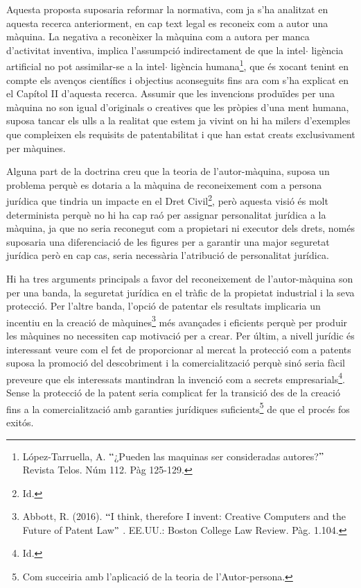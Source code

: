 \documentclass[12pt]{article}
\begin{document}
\vspace{\baselineskip}
Aquesta proposta suposaria reformar la normativa, com ja s’ha analitzat en aquesta recerca anteriorment, en cap text legal es reconeix com a autor una màquina. La negativa a reconèixer la màquina com a autora per manca d’activitat inventiva, implica l’assumpció indirectament de que la intel$ \cdot $ ligència artificial no pot assimilar-se a la intel$ \cdot $ ligència humana\footnote{ López-Tarruella, A. $``$¿Pueden las maquinas ser consideradas autores?$"$  Revista Telos. Núm 112. Pàg 125-129. }, que és xocant tenint en compte els avenços científics i objectius aconseguits fins ara com s’ha explicat en el Capítol II d’aquesta recerca. Assumir que les invencions produïdes per una màquina no son igual d’originals o creatives que les pròpies d’una ment humana, suposa tancar els ulls a la realitat que estem ja vivint on hi ha milers d’exemples que compleixen els requisits de patentabilitat i que han estat creats exclusivament per màquines. \par


\vspace{\baselineskip}
Alguna part de la doctrina creu que la teoria de l’autor-màquina, suposa un problema perquè es dotaria a la màquina de reconeixement com a persona jurídica que tindria un impacte en el Dret Civil\footnote{ Id. }, però aquesta visió és molt determinista perquè no hi ha cap raó per assignar personalitat jurídica a la màquina, ja que no seria reconegut com a propietari ni executor dels drets, només suposaria una diferenciació de les figures per a garantir una major seguretat jurídica però en cap cas, seria necessària l’atribució de personalitat jurídica.  \par


\vspace{\baselineskip}
Hi ha tres arguments principals a favor del reconeixement de l’autor-màquina son per una banda, la seguretat jurídica en el tràfic de la propietat industrial i la seva protecció. Per l’altre banda, l’opció de patentar els resultats implicaria un incentiu en la creació de màquines\footnote{ Abbott, R. (2016). $``$I think, therefore I invent: Creative Computers and the Future of Patent Law$"$ . EE.UU.: Boston College Law Review. Pàg. 1.104. } més avançades i eficients perquè per produir les màquines no necessiten cap motivació per a crear. Per últim, a nivell jurídic és interessant veure com el fet de proporcionar al mercat la protecció com a patents suposa la promoció del descobriment i la comercialització perquè sinó seria fàcil preveure que els interessats mantindran la invenció com a secrets empresarials\footnote{ Id. }. Sense la protecció de la patent seria complicat fer la transició des de la creació fins a la comercialització amb garanties jurídiques suficients\footnote{ Com succeiria amb l’aplicació de la teoria de l’Autor-persona.  } de que el procés fos exitós. \par
\end{document}
